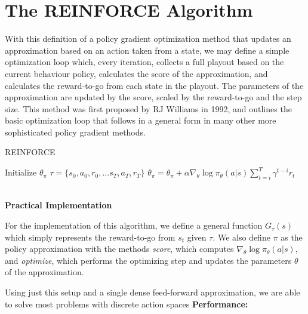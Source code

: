 \documentclass[11pt]{report}
\begin{document}
\section*{The REINFORCE Algorithm}
	With this definition of a policy gradient optimization method that updates an approximation based on an action taken from a state, we may define a simple optimization loop which, every iteration, collects a full playout based on the current behaviour policy, calculates the score of the approximation, and calculates the reward-to-go from each state in the playout. The parameters of the approximation are updated by the score, scaled by the reward-to-go and the step size. This method was first proposed by RJ Williams in 1992, and outlines the basic optimization loop that follows in a general form in many other more sophisticated policy gradient methods.
	\begin{algorithm}
	\caption{REINFORCE}\label{alg:cap}
	\begin{algorithmic}
		\State Initialize $\theta_\pi$
		\While {$\pi_\theta \neq \pi^*$}
			\State $\tau = \{s_0, a_0, r_0, ... s_T, a_T, r_T\}$
				\State $\theta_\pi = \theta_\pi + \alpha\nabla_\theta\log\pi_\theta(a|s)\sum_{t=i}^{T}\gamma^{t-i} r_t$
			\EndFor
		\EndWhile
	\end{algorithmic}
	\end{algorithm}\\
	\textbf{Practical Implementation}
	\par For the implementation of this algorithm, we define a general function $G_\tau(s)$ which simply represents the reward-to-go from $s_t$ given $\tau$. We also define $\pi$ as the policy approximation with the methods \emph{score}, which computes $\nabla_\theta\log\pi_\theta(a|s)$, and \emph{optimize}, which performs the optimizing step and updates the parameters $\theta$ of the approximation.
	
	Using just this setup and a single dense feed-forward approximation, we are able to solve most problems with discrete action spaces 
	\textbf{Performance:}
	\lipsum[1]
\newpage
\end{document}
